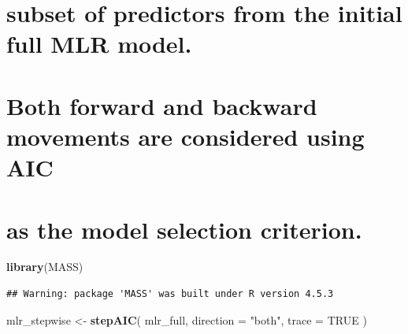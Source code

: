 \documentclass[
]{article}
\newenvironment{Shaded}{\begin{snugshade}}{\end{snugshade}}
\newcommand{\AttributeTok}[1]{\textcolor[rgb]{0.13,0.29,0.53}{#1}}
\newcommand{\ConstantTok}[1]{\textcolor[rgb]{0.56,0.35,0.01}{#1}}
\newcommand{\FunctionTok}[1]{\textcolor[rgb]{0.13,0.29,0.53}{\textbf{#1}}}
\newcommand{\NormalTok}[1]{#1}
\newcommand{\OtherTok}[1]{\textcolor[rgb]{0.56,0.35,0.01}{#1}}
\newcommand{\StringTok}[1]{\textcolor[rgb]{0.31,0.60,0.02}{#1}}
\begin{document}
\section{subset of predictors from the initial full MLR
model.}\label{subset-of-predictors-from-the-initial-full-mlr-model.}

\section{}\label{section-1}

\section{Both forward and backward movements are considered using
AIC}\label{both-forward-and-backward-movements-are-considered-using-aic}

\section{as the model selection
criterion.}\label{as-the-model-selection-criterion.}

\begin{Shaded}
\begin{Highlighting}[]
\FunctionTok{library}\NormalTok{(MASS)}
\end{Highlighting}
\end{Shaded}

\begin{verbatim}
## Warning: package 'MASS' was built under R version 4.5.3
\end{verbatim}

\begin{Shaded}
\begin{Highlighting}[]
\NormalTok{mlr\_stepwise }\OtherTok{\textless{}{-}} \FunctionTok{stepAIC}\NormalTok{(}
\NormalTok{  mlr\_full,}
  \AttributeTok{direction =} \StringTok{"both"}\NormalTok{,}
  \AttributeTok{trace =} \ConstantTok{TRUE}
\NormalTok{)}
\end{Highlighting}
\end{Shaded}
\end{document}
